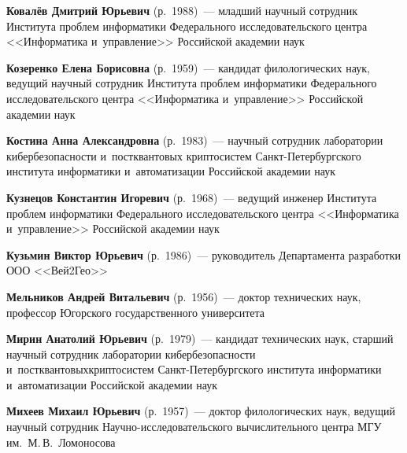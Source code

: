 \begin{multicols}{2}
\noindent
\textbf{Ковалёв Дмитрий Юрьевич} (р.\ 1988)~--- 
младший научный сотрудник Института проб\-лем информатики Федерального 
исследовательского центра <<Информатика и~управ\-ле\-ние>> Российской академии наук


\noindent
\textbf{Козеренко Елена Борисовна} (р.\ 1959)~--- 
кандидат филологических наук, ведущий научный сотрудник Института проб\-лем 
информатики Федерального исследовательского центра <<Информатика и~управ\-ле\-ние>>
Российской академии наук 


\noindent
\textbf{Костина Анна Александровна} (р.\ 1983)~--- 
научный сотрудник лаборатории кибербезопасности и~постквантовых криптосистем 
Санкт-Пе\-тер\-бург\-ско\-го института информатики и~автоматизации Российской академии наук


\noindent
\textbf{Кузнецов Константин Игоревич} (р.\ 1968)~--- 
ведущий инженер Института проб\-лем информатики Федерального 
исследовательского центра <<Информатика и~управ\-ле\-ние>> Российской академии наук


\noindent
\textbf{Кузьмин Виктор Юрьевич} (р.\ 1986)~--- 
руководитель Департамента разработки ООО <<Вей2Гео>>



\pagebreak

\noindent
\textbf{Мельников Андрей Витальевич} (р.\ 1956)~--- 
доктор технических наук, профессор Югорского государственного университета



\noindent
\textbf{Мирин Анатолий Юрьевич} (р.\ 1979)~--- 
кандидат технических наук, старший научный сотрудник ла\-боратории 
кибербезопасности и~постквантовых\linebreak крип\-то\-сис\-тем Санкт-Пе\-тер\-бург\-ско\-го 
института информатики и~автоматизации Российской академии наук


\def\leftkol{ОБ АВТОРАХ}
\def\rightkol{ОБ АВТОРАХ}

\noindent
\textbf{Михеев Михаил Юрьевич} (р.\ 1957)~--- 
доктор филологических наук, ведущий научный сотрудник 
На\-уч\-но-ис\-сле\-до\-ва\-тель\-ско\-го вычислительного центра МГУ им.\ 
М.\,В.~Ломоносова


\end{multicols}
